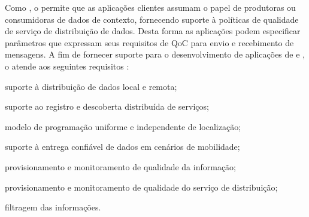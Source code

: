 

Como \middleware, o \cddl permite que as aplicações clientes assumam o papel de produtoras ou consumidoras de dados de contexto, fornecendo suporte à políticas de qualidade de serviço de distribuição de dados. Desta forma as aplicações podem especificar parâmetros que expressam seus requisitos de QoC para envio e recebimento de mensagens. A fim de fornecer suporte para o desenvolvimento de aplicações de \iot e \iomt, o \cddl atende aos seguintes requisitos \cite{muniz:2017}:

\begin{alineas}
	\item suporte à distribuição de dados local e remota;

	\item suporte ao registro e descoberta distribuída de serviços;

	\item modelo de programação uniforme e independente de localização;

	\item suporte à entrega confiável de dados em cenários de mobilidade;

	\item provisionamento e monitoramento de qualidade da informação;

	\item provisionamento e monitoramento de qualidade do serviço de distribuição;

	\item filtragem das informações.
\end{alineas}


